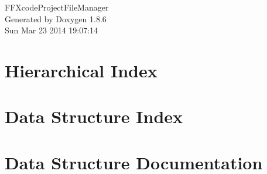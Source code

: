 \documentclass[twoside]{book}
\newcommand{\clearemptydoublepage}{%
  \newpage{\pagestyle{empty}\cleardoublepage}%
}
\begin{document}
\hypersetup{pageanchor=false}
\begin{titlepage}
\vspace*{7cm}
\begin{center}%
{\Large F\-F\-Xcode\-Project\-File\-Manager }\\
\vspace*{1cm}
{\large Generated by Doxygen 1.8.6}\\
\vspace*{0.5cm}
{\small Sun Mar 23 2014 19:07:14}\\
\end{center}
\end{titlepage}
\clearemptydoublepage
\tableofcontents
\clearemptydoublepage
{}
\hypersetup{pageanchor=true}

\chapter{Hierarchical Index}

\chapter{Data Structure Index}

\chapter{Data Structure Documentation}































\newpage
{}
{}
\printindex
\end{document}

